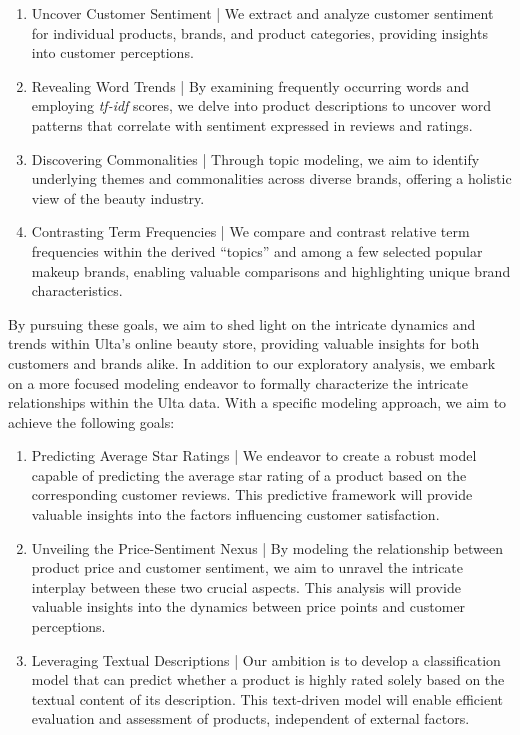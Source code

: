 \documentclass[10pt]{article}
\begin{document}
\begin{enumerate}
    \item Uncover Customer Sentiment | We extract and analyze customer sentiment for individual products, brands, and product categories, providing insights into customer perceptions.
    \item Revealing Word Trends | By examining frequently occurring words and employing \textit{tf-idf} scores, we delve into product descriptions to uncover word patterns that correlate with sentiment expressed in reviews and ratings.
    \item Discovering Commonalities | Through topic modeling, we aim to identify underlying themes and commonalities across diverse brands, offering a holistic view of the beauty industry.
    \item Contrasting Term Frequencies | We compare and contrast relative term frequencies within the derived ``topics'' and among a few selected popular makeup brands, enabling valuable comparisons and highlighting unique brand characteristics.
\end{enumerate}

By pursuing these goals, we aim to shed light on the intricate dynamics and trends within Ulta's online beauty store, providing valuable insights for both customers and brands alike. In addition to our exploratory analysis, we embark on a more focused modeling endeavor to formally characterize the intricate relationships within the Ulta data. With a specific modeling approach, we aim to achieve the following goals:

\begin{enumerate}
    \item Predicting Average Star Ratings | We endeavor to create a robust model capable of predicting the average star rating of a product based on the corresponding customer reviews. This predictive framework will provide valuable insights into the factors influencing customer satisfaction.
    \item Unveiling the Price-Sentiment Nexus | By modeling the relationship between product price and customer sentiment, we aim to unravel the intricate interplay between these two crucial aspects. This analysis will provide valuable insights into the dynamics between price points and customer perceptions.
    \item Leveraging Textual Descriptions | Our ambition is to develop a classification model that can predict whether a product is highly rated solely based on the textual content of its description. This text-driven model will enable efficient evaluation and assessment of products, independent of external factors.
\end{enumerate}
\end{document}
